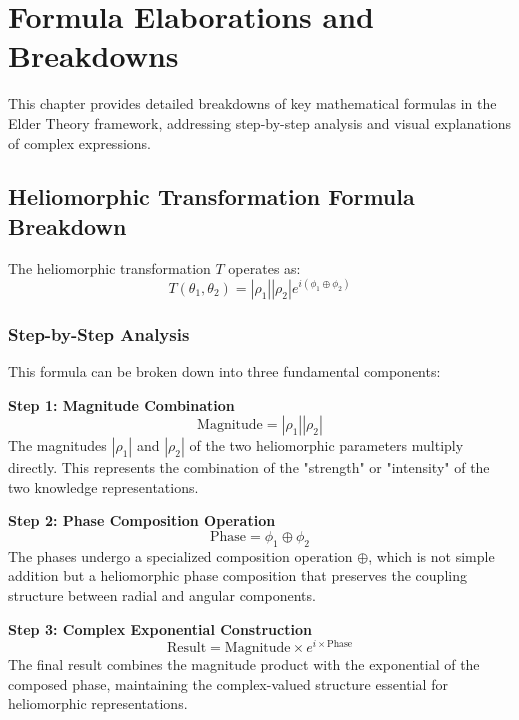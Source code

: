 \chapter{Formula Elaborations and Breakdowns}

This chapter provides detailed breakdowns of key mathematical formulas in the Elder Theory framework, addressing step-by-step analysis and visual explanations of complex expressions.

\section{Heliomorphic Transformation Formula Breakdown}

The heliomorphic transformation $T$ operates as:
\begin{equation}
T(\theta_1,\theta_2) = |\rho_1||\rho_2|e^{i(\phi_1 \oplus \phi_2)}
\end{equation}

\subsection{Step-by-Step Analysis}

This formula can be broken down into three fundamental components:

\textbf{Step 1: Magnitude Combination}
\begin{equation}
\text{Magnitude} = |\rho_1||\rho_2|
\end{equation}
The magnitudes $|\rho_1|$ and $|\rho_2|$ of the two heliomorphic parameters multiply directly. This represents the combination of the "strength" or "intensity" of the two knowledge representations.

\textbf{Step 2: Phase Composition Operation}
\begin{equation}
\text{Phase} = \phi_1 \oplus \phi_2
\end{equation}
The phases undergo a specialized composition operation $\oplus$, which is not simple addition but a heliomorphic phase composition that preserves the coupling structure between radial and angular components.

\textbf{Step 3: Complex Exponential Construction}
\begin{equation}
\text{Result} = \text{Magnitude} \times e^{i \times \text{Phase}}
\end{equation}
The final result combines the magnitude product with the exponential of the composed phase, maintaining the complex-valued structure essential for heliomorphic representations.

